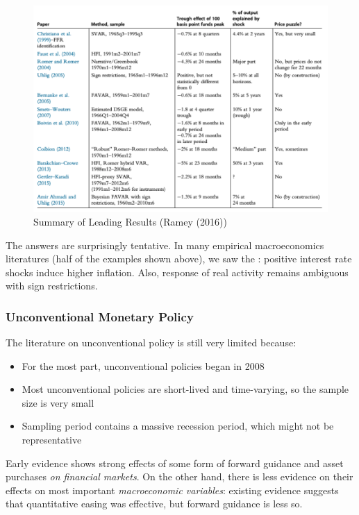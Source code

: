                 \begin{figure}[H]
                    \centering
                    \includegraphics[width=5in]{images/ch8/mp_conclusion.png}
                    \caption{Summary of Leading Results (Ramey (2016))}
                \end{figure}
                The answers are surprisingly tentative. In many empirical macroeconomics literatures (half of the examples shown above), we saw the : positive interest rate shocks induce higher inflation. Also, response of real activity remains ambiguous with sign restrictions.
            
            \subsubsection{Unconventional Monetary Policy}

                The literature on unconventional policy is still very limited because:
                \begin{itemize}
                    \item For the most part, unconventional policies began in 2008
                    \item Most unconventional policies are short-lived and time-varying, so the sample size is very small
                    \item Sampling period contains a massive recession period, which might not be representative
                \end{itemize}
                Early evidence shows strong effects of some form of forward guidance and asset purchases \emph{on financial markets}. On the other hand, there is less evidence on their effects on most important \emph{macroeconomic variables}: existing evidence suggests that quantitative easing was effective, but forward guidance is less so.

